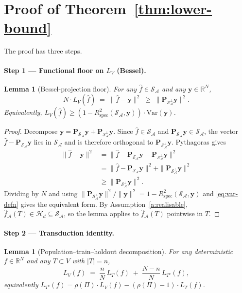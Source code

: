\documentclass[11pt,a4paper]{article}
\theoremstyle{plain}
\newtheorem{lemma}[theorem]{Lemma}
\theoremstyle{definition}
\theoremstyle{remark}
\newcommand{\by}{\mathbf{y}}
\newcommand{\bP}{\mathbf{P}}
\newcommand{\R}{\mathbb{R}}
\newcommand{\Var}{\mathrm{Var}}
\newcommand{\Rspec}{R^2_{\mathrm{spec}}}
\newcommand{\Scal}{\mathcal{S}}
\newcommand{\Acal}{\mathcal{A}}
\newcommand{\Hcal}{\mathcal{H}}
\begin{document}
\section{Proof of Theorem~\ref{thm:lower-bound}}
\label{sec:proof-thm1}

The proof has three steps.

\paragraph{Step 1 — Functional floor on $L_V$ (Bessel).}

\begin{lemma}[Bessel-projection floor]
\label{lem:bessel}
For any $\hat f \in \Scal_\Acal$ and any $\by \in \R^N$,
$$
N \cdot L_V(\hat f) \;=\; \|\hat f - \by\|^2 \;\geq\; \|\bP_{\Scal_\Acal^\perp}\by\|^2.
$$
Equivalently, $L_V(\hat f) \geq (1 - \Rspec(\Scal_\Acal, \by)) \cdot \Var(\by)$.
\end{lemma}

\begin{proof}
Decompose $\by = \bP_{\Scal_\Acal}\by + \bP_{\Scal_\Acal^\perp}\by$.
Since $\hat f \in \Scal_\Acal$ and $\bP_{\Scal_\Acal}\by \in
\Scal_\Acal$, the vector $\hat f - \bP_{\Scal_\Acal}\by$ lies in
$\Scal_\Acal$ and is therefore orthogonal to
$\bP_{\Scal_\Acal^\perp}\by$.  Pythagoras gives
\begin{align*}
    \|\hat f - \by\|^2
    &= \|\hat f - \bP_{\Scal_\Acal}\by - \bP_{\Scal_\Acal^\perp}\by\|^2\\
    &= \|\hat f - \bP_{\Scal_\Acal}\by\|^2 + \|\bP_{\Scal_\Acal^\perp}\by\|^2\\
    &\geq \|\bP_{\Scal_\Acal^\perp}\by\|^2.
\end{align*}
Dividing by $N$ and using $\|\bP_{\Scal_\Acal^\perp}\by\|^2 / \|\by\|^2 =
1 - \Rspec(\Scal_\Acal, \by)$ and \eqref{eq:var-defn} gives the
equivalent form.  By Assumption~\ref{a:realisable},
$\hat f_\Acal(T) \in \Hcal_d \subseteq \Scal_\Acal$, so the lemma applies
to $\hat f_\Acal(T)$ pointwise in $T$.
\end{proof}

\paragraph{Step 2 — Transduction identity.}

\begin{lemma}[Population--train--holdout decomposition]
\label{lem:transduction}
For any deterministic $f \in \R^N$ and any $T \subset V$ with $|T| = n$,
\begin{equation}
    L_V(f) \;=\; \frac{n}{N}\, L_T(f) \;+\; \frac{N-n}{N}\, L_{T^c}(f),
    \label{eq:transduction-identity}
\end{equation}
equivalently
$L_{T^c}(f) = \rho(\Pi) \cdot L_V(f) - (\rho(\Pi) - 1) \cdot L_T(f)$.
\end{lemma}
\end{document}
